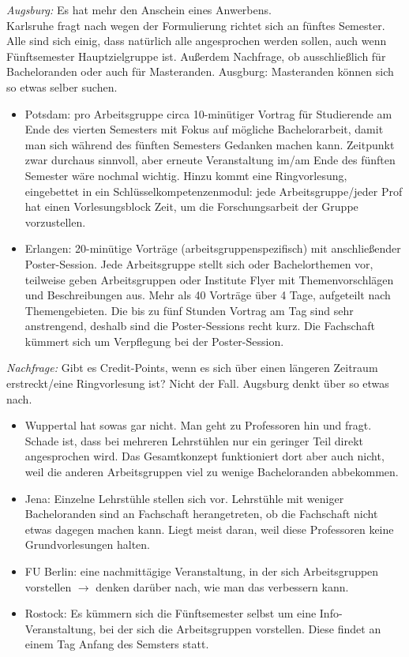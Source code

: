     \textit{Augsburg:} Es hat mehr den Anschein eines \flqq Anwerbens\frqq. \\
    Karlsruhe fragt nach wegen der Formulierung \flqq richtet sich an fünftes Semester\frqq. Alle sind sich einig, dass natürlich alle angesprochen werden sollen, auch wenn Fünftsemester Hauptzielgruppe ist. Außerdem Nachfrage, ob ausschließlich für Bacheloranden oder auch für Masteranden.
    Ausgburg: Masteranden können sich so etwas selber suchen.

    \begin{itemize}
      \item Potsdam: pro Arbeitsgruppe circa 10-minütiger Vortrag für Studierende am Ende des vierten Semesters mit Fokus auf mögliche Bachelorarbeit, damit man sich während des fünften Semesters Gedanken machen kann. Zeitpunkt zwar durchaus sinnvoll, aber erneute Veranstaltung im/am Ende des fünften Semester wäre nochmal wichtig. Hinzu kommt eine Ringvorlesung, eingebettet in ein \flqq Schlüsselkompetenzenmodul\frqq: jede Arbeitsgruppe/jeder Prof hat einen Vorlesungsblock Zeit, um die Forschungsarbeit der Gruppe vorzustellen.
      \item Erlangen: 20-minütige Vorträge (arbeitsgruppenspezifisch) mit anschließender Poster-Session. Jede Arbeitsgruppe stellt sich oder Bachelorthemen vor, teilweise geben Arbeitsgruppen oder Institute Flyer mit Themenvorschlägen und Beschreibungen aus.
      Mehr als 40 Vorträge über 4 Tage, aufgeteilt nach Themengebieten. Die bis zu fünf Stunden Vortrag am Tag sind sehr anstrengend, deshalb sind die Poster-Sessions recht kurz. Die Fachschaft kümmert sich um Verpflegung bei der Poster-Session.
    \end{itemize}

    \textit{Nachfrage:} Gibt es Credit-Points, wenn es sich über einen längeren Zeitraum erstreckt/eine Ringvorlesung ist? Nicht der Fall. Augsburg denkt über so etwas nach.

    \begin{itemize}
      \item Wuppertal hat sowas gar nicht. Man geht zu Professoren hin und fragt. Schade ist, dass bei mehreren Lehrstühlen nur ein geringer Teil direkt angesprochen wird. Das Gesamtkonzept funktioniert dort aber auch nicht, weil die anderen Arbeitsgruppen viel zu wenige Bacheloranden abbekommen.
      \item Jena: Einzelne Lehrstühle stellen sich vor. Lehrstühle mit weniger Bacheloranden sind an Fachschaft herangetreten, ob die Fachschaft nicht etwas dagegen machen kann. Liegt meist daran, weil diese Professoren keine Grundvorlesungen halten.
      \item FU Berlin: eine nachmittägige Veranstaltung, in der sich Arbeitsgruppen vorstellen $\rightarrow$ denken darüber nach, wie man das verbessern kann.
      \item Rostock: Es kümmern sich die Fünftsemester selbst um eine Info-Veranstaltung, bei der sich die Arbeitsgruppen vorstellen. Diese findet an einem Tag Anfang des Semsters statt.
    \end{itemize}

